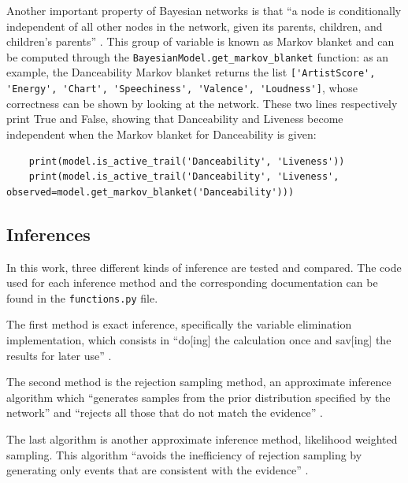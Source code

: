 \documentclass[a4paper, 12pt]{article}
\begin{document}
Another important property of Bayesian networks is that ``a node is conditionally independent of all other nodes in the network, given its parents, children, and children’s parents'' \cite{probabilistic-reasoning}. This group of variable is known as Markov blanket and can be computed through the \verb|BayesianModel.get_markov_blanket| function: as an example, the Danceability Markov blanket returns the list \verb|['ArtistScore', 'Energy', 'Chart', 'Speechiness', 'Valence', 'Loudness']|, whose correctness can be shown by looking at the network. These two lines respectively print True and False, showing that Danceability and Liveness become independent when the Markov blanket for Danceability is given:
\begin{verbatim}
    print(model.is_active_trail('Danceability', 'Liveness'))
    print(model.is_active_trail('Danceability', 'Liveness', observed=model.get_markov_blanket('Danceability')))
\end{verbatim}


\subsection{Inferences}

In this work, three different kinds of inference are tested and compared. The code used for each inference method and the corresponding documentation can be found in the \verb|functions.py| file.

The first method is exact inference, specifically the variable elimination implementation, which consists in ``do[ing] the calculation once and sav[ing] the results for later use'' \cite{probabilistic-reasoning}.

The second method is the rejection sampling method, an approximate inference algorithm which ``generates samples from the prior distribution specified by the network'' \cite{probabilistic-reasoning} and ``rejects all those that do not match the evidence'' \cite{probabilistic-reasoning}.

The last algorithm is another approximate inference method, likelihood weighted sampling. This algorithm ``avoids the inefficiency of rejection sampling by generating only events that are consistent with the evidence'' \cite{probabilistic-reasoning}.
\end{document}
